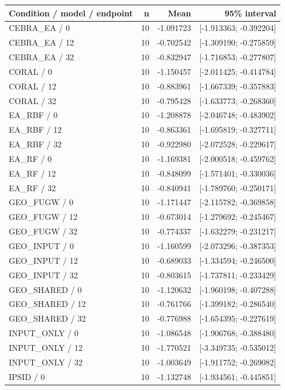 \begin{longtable}{p{.56\linewidth}rrr}
\toprule Condition / model / endpoint & n & Mean & 95\% interval\\\midrule
CEBRA\_EA / 0 & 10 & -1.091723 & [-1.913363; -0.392204] \\
CEBRA\_EA / 12 & 10 & -0.702542 & [-1.309190; -0.275859] \\
CEBRA\_EA / 32 & 10 & -0.832947 & [-1.716853; -0.277807] \\
CORAL / 0 & 10 & -1.150457 & [-2.011425; -0.414784] \\
CORAL / 12 & 10 & -0.883961 & [-1.667339; -0.357883] \\
CORAL / 32 & 10 & -0.795428 & [-1.633773; -0.268360] \\
EA\_RBF / 0 & 10 & -1.208878 & [-2.046748; -0.483902] \\
EA\_RBF / 12 & 10 & -0.863361 & [-1.695819; -0.327711] \\
EA\_RBF / 32 & 10 & -0.922980 & [-2.072528; -0.229617] \\
EA\_RF / 0 & 10 & -1.169381 & [-2.000518; -0.459762] \\
EA\_RF / 12 & 10 & -0.848099 & [-1.571401; -0.330036] \\
EA\_RF / 32 & 10 & -0.840941 & [-1.789760; -0.250171] \\
GEO\_FUGW / 0 & 10 & -1.171447 & [-2.115782; -0.369858] \\
GEO\_FUGW / 12 & 10 & -0.673014 & [-1.279692; -0.245467] \\
GEO\_FUGW / 32 & 10 & -0.774337 & [-1.632279; -0.231217] \\
GEO\_INPUT / 0 & 10 & -1.160599 & [-2.073296; -0.387353] \\
GEO\_INPUT / 12 & 10 & -0.689033 & [-1.334594; -0.246500] \\
GEO\_INPUT / 32 & 10 & -0.803615 & [-1.737811; -0.233429] \\
GEO\_SHARED / 0 & 10 & -1.120632 & [-1.960198; -0.407288] \\
GEO\_SHARED / 12 & 10 & -0.761766 & [-1.399182; -0.286540] \\
GEO\_SHARED / 32 & 10 & -0.776988 & [-1.654395; -0.227619] \\
INPUT\_ONLY / 0 & 10 & -1.086548 & [-1.906768; -0.388480] \\
INPUT\_ONLY / 12 & 10 & -1.770521 & [-3.349735; -0.535012] \\
INPUT\_ONLY / 32 & 10 & -1.003649 & [-1.911752; -0.269082] \\
IPSID / 0 & 10 & -1.132748 & [-1.934561; -0.445851] \\

\end{longtable}
